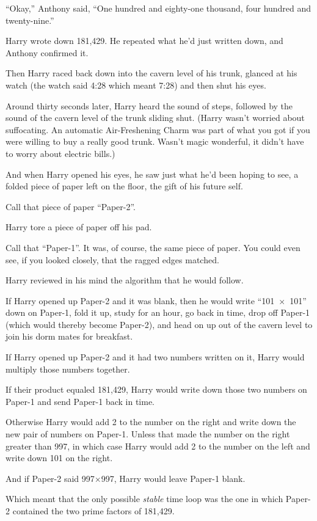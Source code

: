 “Okay,” Anthony said, “One hundred and eighty-one thousand, four hundred and twenty-nine.”

Harry wrote down 181,429. He repeated what he’d just written down, and Anthony confirmed it.

Then Harry raced back down into the cavern level of his trunk, glanced at his watch (the watch said 4:28 which meant 7:28) and then shut his eyes.

Around thirty seconds later, Harry heard the sound of steps, followed by the sound of the cavern level of the trunk sliding shut. (Harry wasn’t worried about suffocating. An automatic Air-Freshening Charm was part of what you got if you were willing to buy a really good trunk. Wasn’t magic wonderful, it didn’t have to worry about electric bills.)

And when Harry opened his eyes, he saw just what he’d been hoping to see, a folded piece of paper left on the floor, the gift of his future self.

Call that piece of paper “Paper-2”.

Harry tore a piece of paper off his pad.

Call that “Paper-1”. It was, of course, the same piece of paper. You could even see, if you looked closely, that the ragged edges matched.

Harry reviewed in his mind the algorithm that he would follow.

If Harry opened up Paper-2 and it was blank, then he would write “101~$\times$~101” down on Paper-1, fold it up, study for an hour, go back in time, drop off Paper-1 (which would thereby become Paper-2), and head on up out of the cavern level to join his dorm mates for breakfast.

If Harry opened up Paper-2 and it had two numbers written on it, Harry would multiply those numbers together.

If their product equaled 181,429, Harry would write down those two numbers on Paper-1 and send Paper-1 back in time.

Otherwise Harry would add 2 to the number on the right and write down the new pair of numbers on Paper-1. Unless that made the number on the right greater than 997, in which case Harry would add 2 to the number on the left and write down 101 on the right.

And if Paper-2 said 997$\times$997, Harry would leave Paper-1 blank.

Which meant that the only possible \emph{stable} time loop was the one in which Paper-2 contained the two prime factors of 181,429.


